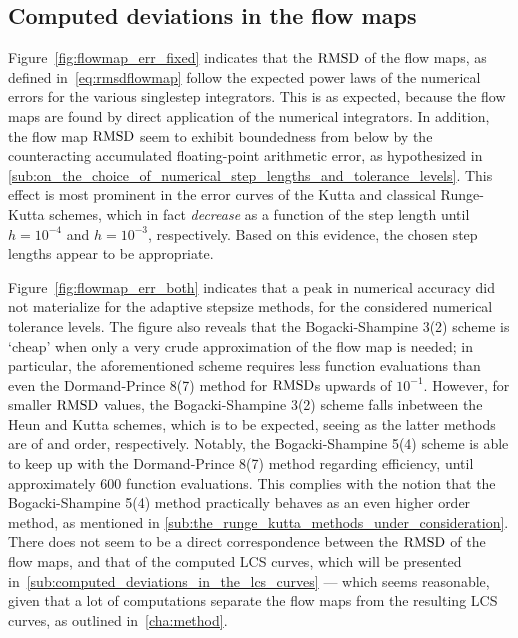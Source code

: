 \subsection{Computed deviations in the flow maps}
\label{sub:computed_deviations_in_the_flow_maps}
Figure~\ref{fig:flowmap_err_fixed} indicates that the $\operatorname{RMSD}$ of the flow maps,
as defined in~\cref{eq:rmsdflowmap} follow the expected power laws
of the numerical errors for the various singlestep integrators. This is
as expected, because the flow maps are found by direct application of the
numerical integrators. In addition, the flow map $\operatorname{RMSD}$ seem to exhibit
boundedness from below by the counteracting accumulated floating-point
arithmetic error, as hypothesized in
\cref{sub:on_the_choice_of_numerical_step_lengths_and_tolerance_levels}.
This effect is most prominent in the error curves of the Kutta and
classical Runge-Kutta schemes, which in fact \emph{decrease} as a function
of the step length until $h=10^{-4}$ and $h=10^{-3}$, respectively. Based on
this evidence, the chosen step lengths appear to be appropriate.

Figure~\ref{fig:flowmap_err_both} indicates that a peak in numerical accuracy
did not materialize for the adaptive stepsize methods, for the considered
numerical tolerance levels. The figure also reveals that the Bogacki-Shampine
3(2) scheme is `cheap' when only a very crude approximation of the flow map is
needed; in particular, the aforementioned scheme requires less function
evaluations than even the Dormand-Prince 8(7) method for $\operatorname{RMSD}$s upwards of
$10^{-1}$. However, for smaller $\operatorname{RMSD}$ values, the Bogacki-Shampine 3(2)
scheme falls inbetween the Heun and Kutta schemes, which is to be expected,
seeing as the latter methods are of  and  order, respectively.
Notably, the Bogacki-Shampine 5(4) scheme is able to keep up with the
Dormand-Prince 8(7) method regarding efficiency, until approximately $600$
function evaluations. This complies with the notion that the Bogacki-Shampine
5(4) method practically behaves as an even higher order method, as mentioned in
\cref{sub:the_runge_kutta_methods_under_consideration}.
There does not seem to be a direct correspondence between the
$\operatorname{RMSD}$ of the flow maps, and that of the computed LCS curves, which will be
presented in~\cref{sub:computed_deviations_in_the_lcs_curves} --- which seems
reasonable, given that a lot of computations separate the flow maps from the
resulting LCS curves, as outlined in~\cref{cha:method}.




